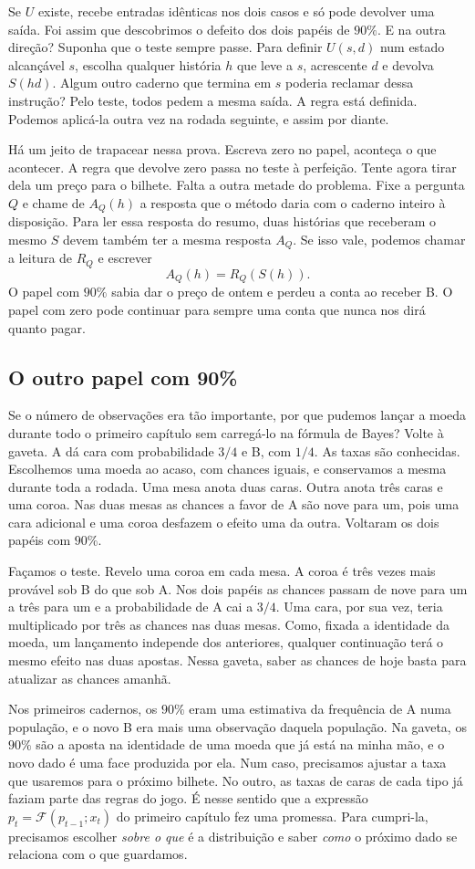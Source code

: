 \documentclass[12pt,oneside]{article}
\newcommand{\secao}[1]{\Needspace{5.2\baselineskip}\subsection*{#1}}
\begin{document}
Se $U$ existe, recebe entradas idênticas nos dois casos e só pode devolver uma saída. Foi assim que descobrimos o defeito dos dois papéis de $90\%$. E na outra direção? Suponha que o teste sempre passe. Para definir $U(s,d)$ num estado alcançável $s$, escolha qualquer história $h$ que leve a $s$, acrescente $d$ e devolva $S(hd)$. Algum outro caderno que termina em $s$ poderia reclamar dessa instrução? Pelo teste, todos pedem a mesma saída. A regra está definida. Podemos aplicá-la outra vez na rodada seguinte, e assim por diante.

Há um jeito de trapacear nessa prova. Escreva zero no papel, aconteça o que acontecer. A regra que devolve zero passa no teste à perfeição. Tente agora tirar dela um preço para o bilhete. Falta a outra metade do problema. Fixe a pergunta $Q$ e chame de $A_Q(h)$ a resposta que o método daria com o caderno inteiro à disposição. Para ler essa resposta do resumo, duas histórias que receberam o mesmo $S$ devem também ter a mesma resposta $A_Q$. Se isso vale, podemos chamar a leitura de $R_Q$ e escrever
\[
                         A_Q(h)=R_Q(S(h)).
\]
O papel com $90\%$ sabia dar o preço de ontem e perdeu a conta ao receber B. O papel com zero pode continuar para sempre uma conta que nunca nos dirá quanto pagar.

\secao{O outro papel com 90\%}
Se o número de observações era tão importante, por que pudemos lançar a moeda durante todo o primeiro capítulo sem carregá-lo na fórmula de Bayes? Volte à gaveta. A dá cara com probabilidade $3/4$ e B, com $1/4$. As taxas são conhecidas. Escolhemos uma moeda ao acaso, com chances iguais, e conservamos a mesma durante toda a rodada. Uma mesa anota duas caras. Outra anota três caras e uma coroa. Nas duas mesas as chances a favor de A são nove para um, pois uma cara adicional e uma coroa desfazem o efeito uma da outra. Voltaram os dois papéis com $90\%$.

Façamos o teste. Revelo uma coroa em cada mesa. A coroa é três vezes mais provável sob B do que sob A. Nos dois papéis as chances passam de nove para um a três para um e a probabilidade de A cai a $3/4$. Uma cara, por sua vez, teria multiplicado por três as chances nas duas mesas. Como, fixada a identidade da moeda, um lançamento independe dos anteriores, qualquer continuação terá o mesmo efeito nas duas apostas. Nessa gaveta, saber as chances de hoje basta para atualizar as chances amanhã.

Nos primeiros cadernos, os $90\%$ eram uma estimativa da frequência de A numa população, e o novo B era mais uma observação daquela população. Na gaveta, os $90\%$ são a aposta na identidade de uma moeda que já está na minha mão, e o novo dado é uma face produzida por ela. Num caso, precisamos ajustar a taxa que usaremos para o próximo bilhete. No outro, as taxas de caras de cada tipo já faziam parte das regras do jogo. É nesse sentido que a expressão $p_t=\mathcal F(p_{t-1};x_t)$ do primeiro capítulo fez uma promessa. Para cumpri-la, precisamos escolher \emph{sobre o que} é a distribuição e saber \emph{como} o próximo dado se relaciona com o que guardamos.
\end{document}
